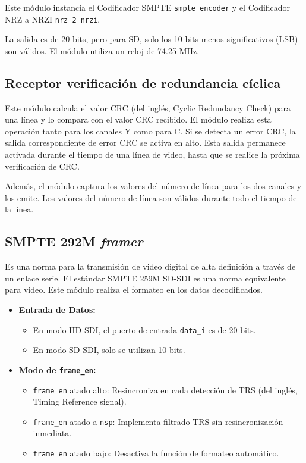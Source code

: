   Este módulo instancia el Codificador SMPTE \texttt{smpte\_encoder} y el
  Codificador NRZ a NRZI \texttt{nrz\_2\_nrzi}.

  La salida es de 20 bits, pero para SD, solo los 10 bits menos significativos
  (LSB) son válidos. El módulo utiliza un reloj de 74.25 MHz.

\subsection{Receptor verificación de redundancia cíclica}

  Este módulo calcula el valor CRC (del inglés, Cyclic Redundancy Check) para una línea y lo compara con el valor CRC
  recibido. El módulo realiza esta operación tanto para los canales Y como para C.
  Si se detecta un error CRC, la salida correspondiente de error CRC se activa en
  alto. Esta salida permanece activada durante el tiempo de una línea de video,
  hasta que se realice la próxima verificación de CRC\@.

  Además, el módulo captura los valores del número de línea para los dos canales
  y los emite. Los valores del número de línea son válidos durante todo el tiempo
  de la línea.

\subsection{SMPTE 292M \textit{framer}}

Es una norma para la transmisión de video digital de alta definición a través
de un enlace serie. El estándar SMPTE 259M SD-SDI es una norma equivalente
para video. Este módulo realiza el formateo en los datos decodificados.

\begin{itemize}
    \item \textbf{Entrada de Datos:}
    \begin{itemize}
        \item En modo HD-SDI, el puerto de entrada \texttt{data\_i} es de 20 bits.
        \item En modo SD-SDI, solo se utilizan 10 bits.
    \end{itemize}
    
    \item \textbf{Modo de \texttt{frame\_en}:}
    \begin{itemize}
        \item \texttt{frame\_en} atado alto: Resincroniza en cada detección de TRS  (del inglés, Timing Reference signal).
        \item \texttt{frame\_en} atado a \texttt{nsp}: Implementa filtrado TRS sin resincronización inmediata.
        \item \texttt{frame\_en} atado bajo: Desactiva la función de formateo automático.
    \end{itemize}
\end{itemize}

